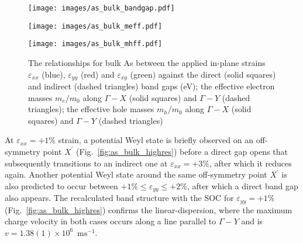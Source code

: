 \begin{figure}[th!]
\begin{subfloat}{
\texttt{[image: images/as\_bulk\_bandgap.pdf]}
  \label{fig:asbulkbg}}
\end{subfloat}
%
\begin{subfloat}[Bulk As $m_e/m_0$]{
\texttt{[image: images/as\_bulk\_meff.pdf]}
  \label{fig:asbulkmeff}}
\end{subfloat}
%
\begin{subfloat}[Bulk As $m_h/m_0$]{
\texttt{[image: images/as\_bulk\_mhff.pdf]}
  \label{fig:asbulkmhff}}
\end{subfloat}
\caption[Electronic properties of bulk arsenic for in-plane strains]
{The relationships for bulk As between 
the applied in-plane strains $\varepsilon_{xx}$ (blue),
$\varepsilon_{yy}$ (red) and $\varepsilon_{xy}$ (green) against 
%
\protect{} 
the direct (solid  squares) and indirect 
(dashed triangles) band gaps (eV);
%
\protect{}  
the effective electron masses $m_e/m_0$ 
along $\Gamma-X$ (solid squares) and 
$\Gamma-Y$ (dashed triangles);
%
\protect{} 
the effective hole masses $m_h/m_0$ 
along $\Gamma-X$ (solid squares) and 
$\Gamma-Y$ (dashed triangles)}
\label{fig:as_bulk_elec_properties}
\end{figure}

%
At $\varepsilon_{xx}=+1\%$ strain, 
a potential Weyl {state} is briefly observed 
on an off-symmetry point $X^\prime$
(Fig.~\ref{fig:as_bulk_highres})
before a direct gap opens 
that subsequently transitions 
to an indirect one 
at $\varepsilon_{xx}=+3\%$, 
after which it reduces again.
%
Another potential Weyl {state} 
around the same off-symmetry point $X^\prime$
is also predicted to occur between 
$+1\%\leq\varepsilon_{yy}\leq+2\%$, 
after which a direct band gap also appears.
%
The recalculated band structure 
with the SOC for $\varepsilon_{yy}=+1\%$
(Fig.~\ref{fig:as_bulk_highres}) 
confirms the linear-dispersion, 
where the maximum charge velocity in both cases  
occurs along a line parallel to $\Gamma-Y$ 
and is $v=1.38(1)\times10^6$~$\textrm{ms}^{-1}$.

